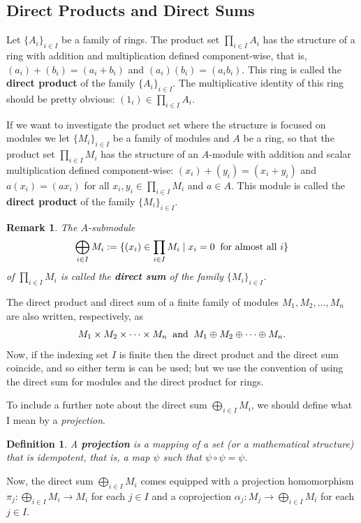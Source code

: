 \documentclass[12pt,reqno]{amsart}
\theoremstyle{plain}
\newtheorem{defi}{Definition}
\newtheorem{rem}{Remark}
\begin{document}
\subsection{Direct Products and Direct Sums}

Let $\{ A_i \}_{i \in I}$ be a family of rings. The product set $\prod_{i \in I} A_i$ has the structure of a ring with addition and multiplication defined component-wise, that is,  $(a_i) + (b_i) = (a_i + b_i)$ and $(a_i)(b_i) = (a_i b_i)$. This ring is called the \textbf{direct product} of the family $\{ A_i\}_{i \in I}$. The multiplicative identity of this ring should be pretty obvious: $(1_i) \in \prod_{i \in I} A_i$. 

If we want to investigate the product set where the structure is focused on modules we let $\{ M_i \}_{i \in I}$ be a family of modules and $A$ be a ring, so that the product set $\prod_{i \in I} M_i$ has the structure of an $A$-module with addition and scalar multiplication defined component-wise: $(x_i) + (y_i) = (x_i + y_i)$ and $a(x_i) = (ax_i)$ for all $x_i, y_i \in \prod_{i \in I} M_i$ and $a \in A$. This module is called the \textbf{direct product} of the family $\{ M_i \}_{i \in I}$. 

\begin{rem} The $A$-submodule 
$$ \bigoplus_{ i \in I} M_i  := \{ (x_i ) \in \prod_{i \in I} M_i \mid x_i = 0 \; \; \textup{for almost all $i$} \}$$ of $\prod_{i \in I} M_i$ is called the \textbf{direct sum} of the family $\{ M_i \}_{i \in I }$. 
\end{rem} 

The direct product and direct sum of a finite family of modules $M_1, M_2, \ldots, M_n$ are also written, respectively, as 
$$M_1 \times M_2 \times \cdots \times M_n \; \; \textup{and} \; \; M_1 \oplus M_2 \oplus \cdots \oplus M_n.$$
Now, if the indexing set $I$ is finite then the direct product and the direct sum coincide, and so either term is can be used; but we use the convention of using the direct sum for modules and the direct product for rings. 

To include a further note about the direct sum $\bigoplus_{i \in I} M_i$, we should define what I mean by a \textit{projection}. 
\begin{defi}\label{def: projection} A \textbf{projection} is a mapping of a set (or a mathematical structure) that is idempotent, that is, a map $\psi$ such that $\psi \circ \psi = \psi$. 
\end{defi} 

Now, the direct sum $\bigoplus_{i \in I} M_i$ comes equipped with a projection homomorphism $\pi_j \colon \bigoplus_{i \in I} M_i \to M_i$ for each $j \in I$ and a coprojection $\alpha_j \colon M_j \to \bigoplus_{i \in I} M_i$ for each $j \in I$.
\end{document}
